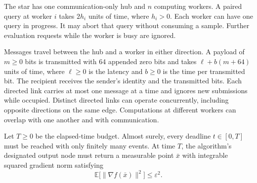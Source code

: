 \documentclass[10pt]{article}
\theoremstyle{definition}
\begin{document}
The star has one communication-only hub and $n$ computing workers. A paired query at worker $i$ takes $2h_i$ units of time, where $h_i>0$. Each worker can have one query in progress. It may abort that query without consuming a sample. Further evaluation requests while the worker is busy are ignored.

Messages travel between the hub and a worker in either direction. A payload of $m\geq 0$ bits is transmitted with 64 appended zero bits and takes $\ell+b(m+64)$ units of time, where $\ell\geq 0$ is the latency and $b\geq 0$ is the time per transmitted bit. The recipient receives the sender's identity and the transmitted bits. Each directed link carries at most one message at a time and ignores new submissions while occupied. Distinct directed links can operate concurrently, including opposite directions on the same edge. Computations at different workers can overlap with one another and with communication.

Let $T\geq 0$ be the elapsed-time budget. Almost surely, every deadline $t\in[0,T]$ must be reached with only finitely many events. At time $T$, the algorithm's designated output node must return a measurable point $\bar{x}$ with integrable squared gradient norm satisfying
\[
\mathbb{E}\bigl[\|\nabla f(\bar{x})\|^2\bigr]\leq\varepsilon^2.
\]
\end{document}
